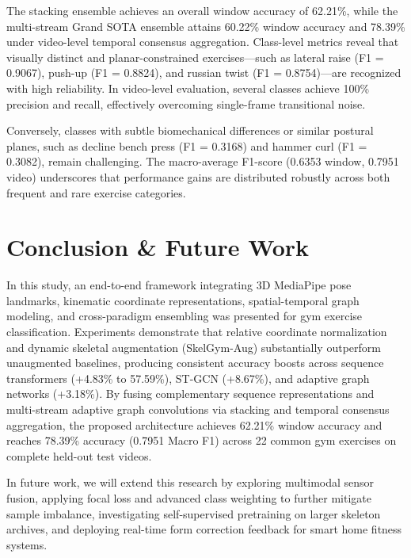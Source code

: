 \documentclass[runningheads]{llncs}
\begin{document}
The stacking ensemble achieves an overall window accuracy of 62.21\%, while the multi-stream Grand SOTA ensemble attains 60.22\% window accuracy and 78.39\% under video-level temporal consensus aggregation. Class-level metrics reveal that visually distinct and planar-constrained exercises—such as lateral raise (F1 = 0.9067), push-up (F1 = 0.8824), and russian twist (F1 = 0.8754)—are recognized with high reliability. In video-level evaluation, several classes achieve 100\% precision and recall, effectively overcoming single-frame transitional noise.

Conversely, classes with subtle biomechanical differences or similar postural planes, such as decline bench press (F1 = 0.3168) and hammer curl (F1 = 0.3082), remain challenging. The macro-average F1-score (0.6353 window, 0.7951 video) underscores that performance gains are distributed robustly across both frequent and rare exercise categories.

\section{Conclusion \& Future Work}

In this study, an end-to-end framework integrating 3D MediaPipe pose landmarks, kinematic coordinate representations, spatial-temporal graph modeling, and cross-paradigm ensembling was presented for gym exercise classification. Experiments demonstrate that relative coordinate normalization and dynamic skeletal augmentation (SkelGym-Aug) substantially outperform unaugmented baselines, producing consistent accuracy boosts across sequence transformers (+4.83\% to 57.59\%), ST-GCN (+8.67\%), and adaptive graph networks (+3.18\%). By fusing complementary sequence representations and multi-stream adaptive graph convolutions via stacking and temporal consensus aggregation, the proposed architecture achieves 62.21\% window accuracy and reaches 78.39\% accuracy (0.7951 Macro F1) across 22 common gym exercises on complete held-out test videos.

In future work, we will extend this research by exploring multimodal sensor fusion, applying focal loss and advanced class weighting to further mitigate sample imbalance, investigating self-supervised pretraining on larger skeleton archives, and deploying real-time form correction feedback for smart home fitness systems.
\end{document}
